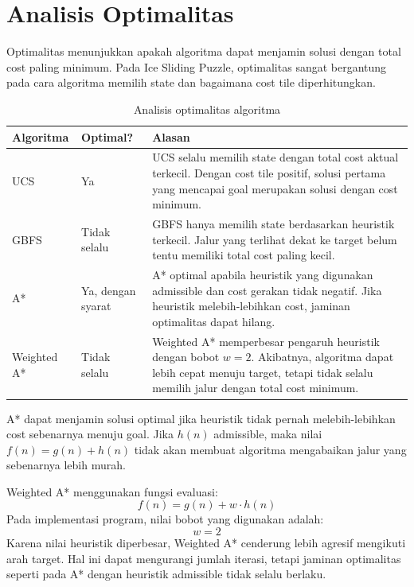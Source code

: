 \section{Analisis Optimalitas}

Optimalitas menunjukkan apakah algoritma dapat menjamin solusi dengan total cost paling minimum. 
Pada Ice Sliding Puzzle, optimalitas sangat bergantung pada cara algoritma memilih state dan bagaimana cost tile diperhitungkan.

\begin{table}[H]
	\centering
	\caption{Analisis optimalitas algoritma}
	\begin{tabular}{|p{3cm}|p{3cm}|p{8cm}|}
		\hline
		\rowcolor{green!15}
		\textbf{Algoritma} & \textbf{Optimal?} & \textbf{Alasan} \\
		\hline
		UCS & Ya & UCS selalu memilih state dengan total cost aktual terkecil. Dengan cost tile positif, solusi pertama yang mencapai goal merupakan solusi dengan cost minimum. \\
		\hline
		GBFS & Tidak selalu & GBFS hanya memilih state berdasarkan heuristik terkecil. Jalur yang terlihat dekat ke target belum tentu memiliki total cost paling kecil. \\
		\hline
		A* & Ya, dengan syarat & A* optimal apabila heuristik yang digunakan admissible dan cost gerakan tidak negatif. Jika heuristik melebih-lebihkan cost, jaminan optimalitas dapat hilang. \\
		\hline
		Weighted A* & Tidak selalu & Weighted A* memperbesar pengaruh heuristik dengan bobot $w=2$. Akibatnya, algoritma dapat lebih cepat menuju target, tetapi tidak selalu memilih jalur dengan total cost minimum. \\
		\hline
	\end{tabular}
\end{table}

\begin{tcolorbox}[
	colback=green!5,
	colframe=green!50!black,
	title=\textbf{Hubungan Admissibility dan Optimalitas A*},
	arc=2mm,
	boxrule=0.8pt
]
A* dapat menjamin solusi optimal jika heuristik tidak pernah melebih-lebihkan cost sebenarnya menuju goal. 
Jika $h(n)$ admissible, maka nilai $f(n)=g(n)+h(n)$ tidak akan membuat algoritma mengabaikan jalur yang sebenarnya lebih murah.
\end{tcolorbox}

\begin{tcolorbox}[
	colback=purple!5,
	colframe=purple!60!black,
	title=\textbf{Optimalitas pada Weighted A*},
	arc=2mm,
	boxrule=0.8pt
]
Weighted A* menggunakan fungsi evaluasi:
\[
	f(n)=g(n)+w \cdot h(n)
\]
Pada implementasi program, nilai bobot yang digunakan adalah:
\[
	w=2
\]
Karena nilai heuristik diperbesar, Weighted A* cenderung lebih agresif mengikuti arah target. 
Hal ini dapat mengurangi jumlah iterasi, tetapi jaminan optimalitas seperti pada A* dengan heuristik admissible tidak selalu berlaku.
\end{tcolorbox}

